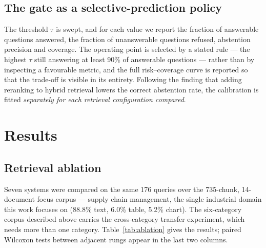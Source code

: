 \documentclass[preprint,3p,times]{elsarticle}
\begin{document}
\subsection{The gate as a selective-prediction policy}

The threshold $\tau$ is swept, and for each value we report the fraction of
answerable questions answered, the fraction of unanswerable questions refused,
abstention precision and coverage. The operating point is selected by a stated
rule --- the highest $\tau$ still answering at least 90\% of answerable
questions --- rather than by inspecting a favourable metric, and the full
risk--coverage curve is reported so that the trade-off is visible in its
entirety. Following the finding that adding reranking to hybrid retrieval
lowers the correct abstention rate, the calibration is fitted \emph{separately
for each retrieval configuration compared}.

\section{Results}
\label{sec:results}

\subsection{Retrieval ablation}

Seven systems were compared on the same 176 queries over the
735-chunk, 14-document focus corpus ---
supply chain management, the single industrial domain this work focuses on
(88.8\% text, 6.0\% table, 5.2\% chart).
The six-category corpus described above carries the cross-category transfer
experiment, which needs more than one category.
Table~\ref{tab:ablation} gives the results; paired Wilcoxon tests between
adjacent rungs appear in the last two columns.
\end{document}
